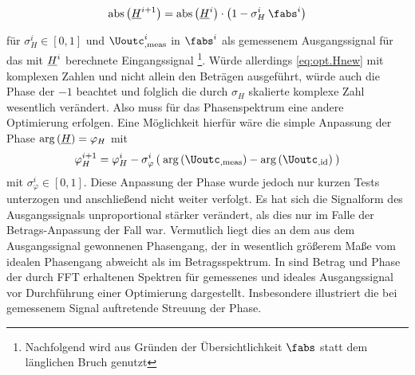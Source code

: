 \documentclass[../Report.tex]{subfiles}
\begin{document}
\begin{align}
\label{eq:opt.Hnew}
	\mathrm{abs} \left( \Hcompl^{i+1} \right)
		=\mathrm{abs} \left( \Hcompl^{i}  \right) \cdot
		\left( 1 - \sigma_H^i \: \fabs^{i}	\right)					 
\end{align}

für $\sigma_H^i \in \left[ 0 , 1 \right]$ und $\Uoutc_{, \mathrm{meas}}^{i}$ in $\fabs^{i}$ als gemessenem Ausgangssignal für das mit $\underline{H}^{i}$ berechnete Eingangssignal \footnote{Nachfolgend wird aus Gründen der Übersichtlichkeit $\fabs$ statt dem länglichen Bruch genutzt}.
Würde allerdings \eqref{eq:opt.Hnew} mit komplexen Zahlen und nicht allein den Beträgen ausgeführt, würde auch die Phase der $-1$ beachtet und folglich die durch $\sigma_H$ skalierte komplexe Zahl wesentlich verändert. Also muss für das Phasenspektrum eine andere Optimierung erfolgen.
Eine Möglichkeit hierfür wäre die simple Anpassung der Phase $ \mathrm{arg} \left( \underline{H} \right) = \varphi_H$ mit 
\begin{align}
\label{eq:opt.HnewPhase}
	\varphi_H^{i+1} = \varphi_H^{i} - \sigma_{\varphi}^{i} 
			\left( \: \mathrm{arg} \left( \Uoutc_{, \mathrm{meas}} \right)
					- \mathrm{arg} \left( \Uoutc_{, \mathrm{id}} \right) \: \right)
\end{align}
mit $\sigma_{\varphi}^i \in \left[ 0 , 1 \right]$. Diese Anpassung der Phase wurde jedoch nur kurzen Tests unterzogen und anschließend nicht weiter verfolgt. Es hat sich die Signalform des Ausgangssignals unproportional stärker verändert, als dies nur im Falle der Betrags-Anpassung der Fall war. Vermutlich %
liegt dies an dem aus dem Ausgangssignal gewonnenen Phasengang, der in wesentlich größerem Maße vom idealen Phasengang abweicht als im Betragsspektrum. In  sind Betrag und Phase der durch FFT erhaltenen Spektren für gemessenes und ideales Ausgangssignal vor Durchführung einer Optimierung dargestellt. Insbesondere illustriert  die bei gemessenem Signal auftretende Streuung der Phase. 
\\


 \absSpectIdeal 
{} \absSpectMeas
{} \angleSpectIdeal 
{} \angleSpectMeas 
\end{document}
